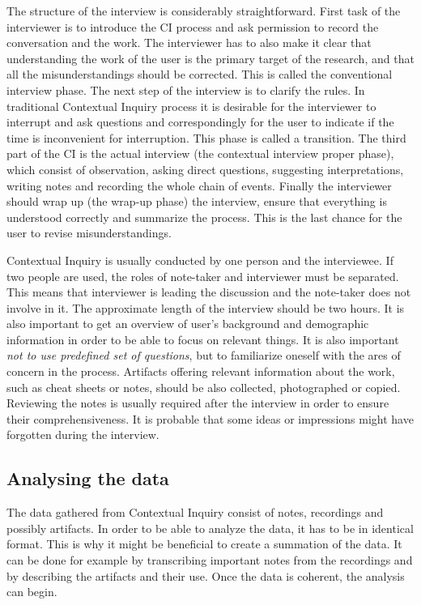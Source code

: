 \documentclass[12pt,a4paper,oneside,pdftex]{report}
\begin{document}
The structure of the interview is considerably straightforward. First task of the interviewer is to introduce the CI process and ask permission to record the conversation and the work. The interviewer has to also make it clear that understanding the work of the user is the primary target of the research, and that all the misunderstandings should be corrected. This is called the conventional interview phase. The next step of the interview is to clarify the rules. In traditional Contextual Inquiry process it is desirable for the interviewer to interrupt and ask questions and correspondingly for the user to indicate if the time is inconvenient for interruption. This phase is called a transition. The third part of the CI is the actual interview (the contextual interview proper phase), which consist of observation, asking direct questions, suggesting interpretations, writing notes and recording the whole chain of events. Finally the interviewer should wrap up (the wrap-up phase) the interview, ensure that everything is understood correctly and summarize the process. This is the last chance for the user to revise misunderstandings. \cite{RefWorks:21}

Contextual Inquiry is usually conducted by one person and the interviewee. If two people are used, the roles of note-taker and interviewer must be separated. This means that interviewer is leading the discussion and the note-taker does not involve in it. The approximate length of the interview should be two hours. It is also important to get an overview of user's background and demographic information in order to be able to focus on relevant things. It is also important \emph{not to use predefined set of questions}, but to familiarize oneself  with the ares of concern in the process. Artifacts offering relevant information about the work, such as cheat sheets or notes, should be also collected, photographed or copied. \cite{RefWorks:27} Reviewing the notes is usually required after the interview in order to ensure their comprehensiveness. It is probable that some ideas or impressions might have forgotten during the interview. \cite{RefWorks:28}


\subsection{Analysing the data}

The data gathered from Contextual Inquiry consist of notes, recordings and possibly artifacts. In order to be able to analyze the data, it has to be in identical format. This is why it might be beneficial to create a summation of the data. It can be done for example by transcribing important notes from the recordings and by describing the artifacts and their use. Once the data is coherent, the analysis can begin. 
\end{document}
